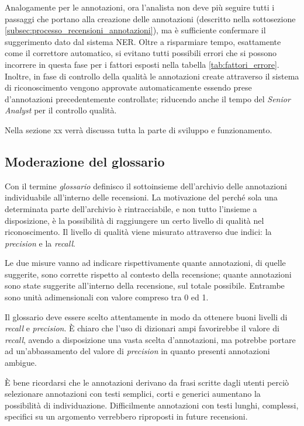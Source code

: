 Analogamente per le annotazioni, ora l'analista non deve più seguire tutti i
passaggi che portano alla creazione delle annotazioni (descritto nella
sottosezione \ref{subsec:processo_recensioni_annotazioni}), ma è sufficiente
confermare il suggerimento dato dal sistema \gls{NER}. Oltre a risparmiare
tempo, esattamente come il correttore automatico, si evitano tutti possibili
errori che si possono incorrere in questa fase per i fattori esposti nella
tabella \ref{tab:fattori_errore}. Inoltre, in fase di controllo della qualità le
annotazioni create attraverso il sistema di riconoscimento vengono approvate
automaticamente essendo prese d'annotazioni precedentemente controllate;
riducendo anche il tempo del \textit{Senior Analyst} per il controllo qualità.

Nella sezione xx verrà discussa tutta la parte di sviluppo e funzionamento.

\subsection{Moderazione del glossario}
Con il termine \textit{glossario} definisco il sottoinsieme dell'archivio
delle annotazioni individuabile all'interno delle recensioni. La motivazione del
perché sola una determinata parte dell'archivio è rintracciabile, e non tutto
l'insieme a disposizione, è la possibilità di raggiungere un certo livello di
qualità nel riconoscimento. Il livello di qualità viene misurato attraverso due
indici: la \textit{precision} e la \textit{recall}.

Le due misure vanno ad indicare rispettivamente quante annotazioni, di quelle
suggerite, sono corrette rispetto al contesto della recensione; quante
annotazioni sono state suggerite all'interno della recensione, sul totale
possibile. Entrambe sono unità adimensionali con valore compreso tra 0 ed 1.

Il glossario deve essere scelto attentamente in modo da ottenere buoni livelli
di \textit{recall} e \textit{precision}. È chiaro che l'uso di dizionari ampi
favorirebbe il valore di \textit{recall}, avendo a disposizione una vasta scelta
d'annotazioni, ma potrebbe portare ad un'abbassamento del valore di
\textit{precision} in quanto presenti annotazioni ambigue.

È bene ricordarsi che le annotazioni derivano da frasi scritte dagli utenti
perciò selezionare annotazioni con testi semplici, corti e generici aumentano
la possibilità di individuazione. Difficilmente annotazioni con testi lunghi,
complessi, specifici su un argomento verrebbero riproposti in future recensioni.

